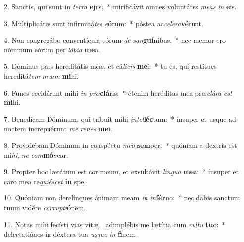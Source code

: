 2. Sanctis, qui sunt in \textit{ter}\textit{ra} \textbf{e}jus,~*  mirificávit omnes voluntátes \textit{me}\textit{as} \textit{in} \textbf{e}is.\

3. Multiplicátæ sunt infirmitá\textit{tes} \textit{e}\textbf{ó}rum:~*  póstea ac\textit{ce}\textit{le}\textit{ra}\textbf{vé}runt.\

4. Non congregábo conventícula eórum \textit{de} \textit{san}\textbf{guí}nibus,~*  nec memor ero nóminum eórum per \textit{lá}\textit{bi}\textit{a} \textbf{me}a.\

5. Dóminus pars hereditátis meæ, et cá\textit{li}\textit{cis} \textbf{me}i:~*  tu es, qui restítues hereditá\textit{tem} \textit{me}\textit{am} \textbf{mi}hi.\

6. Funes cecidérunt mihi \textit{in} \textit{præ}\textbf{clá}ris:~*  étenim heréditas mea præ\textit{clá}\textit{ra} \textit{est} \textbf{mi}hi.\

7. Benedícam Dóminum, qui tríbuit mihi \textit{in}\textit{tel}\textbf{léc}tum:~*  ínsuper et usque ad noctem increpuérunt \textit{me} \textit{re}\textit{nes} \textbf{me}i.\

8. Providébam Dóminum in conspéctu \textit{me}\textit{o} \textbf{sem}per:~*  quóniam a dextris est mi\textit{hi}, \textit{ne} \textit{com}\textbf{mó}vear.\

9. Propter hoc lætátum est cor meum, et exsultávit \textit{lin}\textit{gua} \textbf{me}a:~*  ínsuper et caro mea re\textit{qui}\textit{é}\textit{scet} \textbf{in} spe.\

10. Quóniam non derelínques ánimam meam \textit{in} \textit{in}\textbf{fér}no:~*  nec dabis sanctum tuum vidére \textit{cor}\textit{rup}\textit{ti}\textbf{ó}nem.\

11. Notas mihi fecísti vias vitæ, \dag\  adimplébis me lætítia cum \textit{vul}\textit{tu} \textbf{tu}o:~*  delectatiónes in déxtera tua \textit{us}\textit{que} \textit{in} \textbf{fi}nem.\


